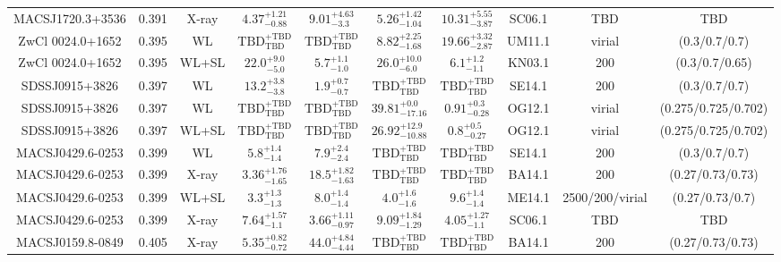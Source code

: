 \begin{table}
\begin{tabular}{cccccccccc}
MACSJ1720.3+3536 & 0.391 & X-ray & ${4.37}^{+1.21}_{-0.88}$ & ${9.01}^{+4.63}_{-3.3}$ & ${5.26}^{+1.42}_{-1.04}$ & ${10.31}^{+5.55}_{-3.87}$ & SC06.1 & TBD & TBD \\
ZwCl 0024.0+1652 & 0.395 & WL & ${\mathrm{TBD}}^{+\mathrm{TBD}}_{\mathrm{TBD}}$ & ${\mathrm{TBD}}^{+\mathrm{TBD}}_{\mathrm{TBD}}$ & ${8.82}^{+2.25}_{-1.68}$ & ${19.66}^{+3.32}_{-2.87}$ & UM11.1 & virial & (0.3/0.7/0.7) \\
ZwCl 0024.0+1652 & 0.395 & WL+SL & ${22.0}^{+9.0}_{-5.0}$ & ${5.7}^{+1.1}_{-1.0}$ & ${26.0}^{+10.0}_{-6.0}$ & ${6.1}^{+1.2}_{-1.1}$ & KN03.1 & 200 & (0.3/0.7/0.65) \\
SDSSJ0915+3826 & 0.397 & WL & ${13.2}^{+3.8}_{-3.8}$ & ${1.9}^{+0.7}_{-0.7}$ & ${\mathrm{TBD}}^{+\mathrm{TBD}}_{\mathrm{TBD}}$ & ${\mathrm{TBD}}^{+\mathrm{TBD}}_{\mathrm{TBD}}$ & SE14.1 & 200 & (0.3/0.7/0.7) \\
SDSSJ0915+3826 & 0.397 & WL & ${\mathrm{TBD}}^{+\mathrm{TBD}}_{\mathrm{TBD}}$ & ${\mathrm{TBD}}^{+\mathrm{TBD}}_{\mathrm{TBD}}$ & ${39.81}^{+0.0}_{-17.16}$ & ${0.91}^{+0.3}_{-0.28}$ & OG12.1 & virial & (0.275/0.725/0.702) \\
SDSSJ0915+3826 & 0.397 & WL+SL & ${\mathrm{TBD}}^{+\mathrm{TBD}}_{\mathrm{TBD}}$ & ${\mathrm{TBD}}^{+\mathrm{TBD}}_{\mathrm{TBD}}$ & ${26.92}^{+12.9}_{-10.88}$ & ${0.8}^{+0.5}_{-0.27}$ & OG12.1 & virial & (0.275/0.725/0.702) \\
MACSJ0429.6-0253 & 0.399 & WL & ${5.8}^{+1.4}_{-1.4}$ & ${7.9}^{+2.4}_{-2.4}$ & ${\mathrm{TBD}}^{+\mathrm{TBD}}_{\mathrm{TBD}}$ & ${\mathrm{TBD}}^{+\mathrm{TBD}}_{\mathrm{TBD}}$ & SE14.1 & 200 & (0.3/0.7/0.7) \\
MACSJ0429.6-0253 & 0.399 & X-ray & ${3.36}^{+1.76}_{-1.65}$ & ${18.5}^{+1.82}_{-1.63}$ & ${\mathrm{TBD}}^{+\mathrm{TBD}}_{\mathrm{TBD}}$ & ${\mathrm{TBD}}^{+\mathrm{TBD}}_{\mathrm{TBD}}$ & BA14.1 & 200 & (0.27/0.73/0.73) \\
MACSJ0429.6-0253 & 0.399 & WL+SL & ${3.3}^{+1.3}_{-1.3}$ & ${8.0}^{+1.4}_{-1.4}$ & ${4.0}^{+1.6}_{-1.6}$ & ${9.6}^{+1.4}_{-1.4}$ & ME14.1 & 2500/200/virial & (0.27/0.73/0.7) \\
MACSJ0429.6-0253 & 0.399 & X-ray & ${7.64}^{+1.57}_{-1.1}$ & ${3.66}^{+1.11}_{-0.97}$ & ${9.09}^{+1.84}_{-1.29}$ & ${4.05}^{+1.27}_{-1.1}$ & SC06.1 & TBD & TBD \\
MACSJ0159.8-0849 & 0.405 & X-ray & ${5.35}^{+0.82}_{-0.72}$ & ${44.0}^{+4.84}_{-4.44}$ & ${\mathrm{TBD}}^{+\mathrm{TBD}}_{\mathrm{TBD}}$ & ${\mathrm{TBD}}^{+\mathrm{TBD}}_{\mathrm{TBD}}$ & BA14.1 & 200 & (0.27/0.73/0.73) \\

\end{tabular}
\end{table}
